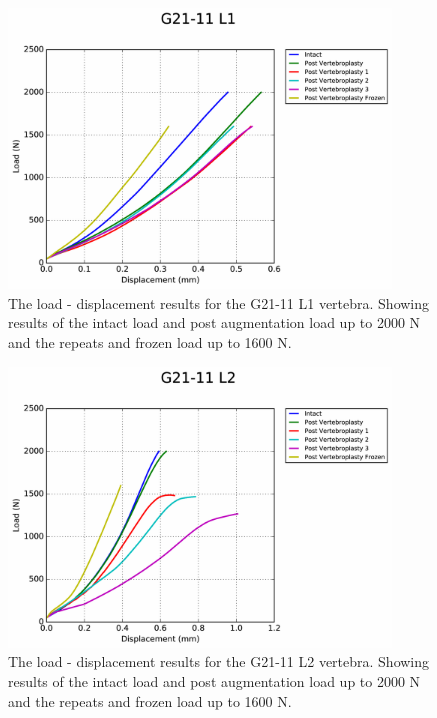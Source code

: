 \begin{figure}[ht!]
  \centering
  \includegraphics[width=4in]{Chapters/Chapter_HT_images/G21-11_L1.pdf}
  \caption{The load - displacement results for the G21-11 L1 vertebra. Showing
    results of the intact load and post augmentation load up to 2000 N and the
    repeats and frozen load up to 1600 N.}
  \label{fig:G21-11_L1}
\end{figure}

\begin{figure}[ht!]
  \centering
  \includegraphics[width=4in]{Chapters/Chapter_HT_images/G21-11_L2.pdf}
  \caption{The load - displacement results for the G21-11 L2 vertebra. Showing
    results of the intact load and post augmentation load up to 2000 N and the
    repeats and frozen load up to 1600 N.}
  \label{fig:G21-11_L2}
\end{figure}

